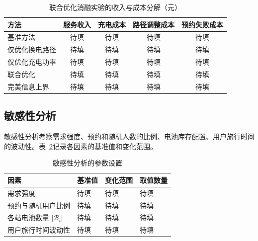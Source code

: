 \begin{table}[!htbp]
  \centering
  \caption{联合优化消融实验的收入与成本分解（元）}
  \label{exp:joint_costs}
  \small
  \begin{tabularx}{\linewidth}{@{}Xcccc@{}}
    \toprule
    方法 & 服务收入 & 充电成本 & 路径调整成本 & 预约失败成本 \\
    \midrule
    基准方法 & 待填 & 待填 & 待填 & 待填 \\
    仅优化换电路径 & 待填 & 待填 & 待填 & 待填 \\
    仅优化充电功率 & 待填 & 待填 & 待填 & 待填 \\
    联合优化 & 待填 & 待填 & 待填 & 待填 \\
    完美信息上界 & 待填 & 待填 & 待填 & 待填 \\
    \bottomrule
  \end{tabularx}
\end{table}



\FloatBarrier
\subsection{敏感性分析}
\label{exp:sensitivity}

敏感性分析考察需求强度、预约和随机人数的比例、电池库存配置、用户旅行时间的波动性。表~\ref{exp:sensitivity_settings}记录各因素的基准值和变化范围。

\begin{table}[!htbp]
  \centering
  \caption{敏感性分析的参数设置}
  \label{exp:sensitivity_settings}
  \small
  \begin{tabularx}{\linewidth}{@{}Xlll@{}}
    \toprule
    因素 & 基准值 & 变化范围 & 取值数量 \\
    \midrule
    需求强度 & 待填 & 待填 & 待填 \\
    预约与随机用户比例 & 待填 & 待填 & 待填 \\
    各站电池数量 $|\mathcal B_i|$ & 待填 & 待填 & 待填 \\
    用户旅行时间波动性 & 待填 & 待填 & 待填 \\
    \bottomrule
  \end{tabularx}
\end{table}



